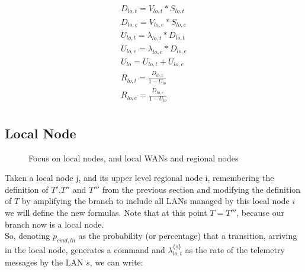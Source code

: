 \documentclass[11pt]{article}
\begin{document}
\begin{equation}
    \begin{array}{l}
        D_{lo, t} = V_{lo, t} * S_{lo, t} \\
        D_{lo, e} = V_{lo, e} * S_{lo, e} \\
        U_{lo, t} = \lambda_{lo, t} * D_{lo, t} \\
        U_{lo, e} = \lambda_{lo, e} * D_{lo, e} \\
        U_{lo} = U_{lo, t} + U_{lo, e} \\
        R_{lo, t} = \frac{D_{lo, t}}{1 - U_{lo}} \\
        R_{lo, e} = \frac{D_{lo, e}}{1 - U_{lo}} \\
    \end{array}
\end{equation}

\subsection{Local Node}
\begin{figure}[H]
	\centering
	\hspace*{-3.7cm}
	\frame{}
	\caption{Focus on local nodes, and local WANs and regional nodes}
\end{figure}

Taken a local node j, and its upper level regional node i, remembering the definition of $T'$,$T''$ and $T'''$ from the previous section and modifying the definition of $T$ by amplifying the branch to include all LANs managed by this local node $i$ we will define the new formulas. Note that at this point $T = T'''$, because our branch now is a local node. \\

So, denoting $p_{cmd,ln}$ as the probability (or percentage) that a transition, arriving in the local node, generates a command and $\lambda^{\{s\}}_{lo, t}$ as the rate of the telemetry messages by the LAN $s$, we can write:
\end{document}

